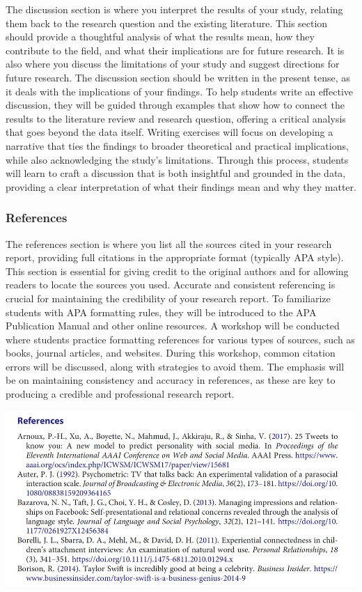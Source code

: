 \documentclass[
]{book}
\begin{document}
The discussion section is where you interpret the results of your study, relating them back to the research question and the existing literature. This section should provide a thoughtful analysis of what the results mean, how they contribute to the field, and what their implications are for future research. It is also where you discuss the limitations of your study and suggest directions for future research. The discussion section should be written in the present tense, as it deals with the implications of your findings. To help students write an effective discussion, they will be guided through examples that show how to connect the results to the literature review and research question, offering a critical analysis that goes beyond the data itself. Writing exercises will focus on developing a narrative that ties the findings to broader theoretical and practical implications, while also acknowledging the study's limitations. Through this process, students will learn to craft a discussion that is both insightful and grounded in the data, providing a clear interpretation of what their findings mean and why they matter.

\subsubsection*{References}\label{references}

The references section is where you list all the sources cited in your research report, providing full citations in the appropriate format (typically APA style). This section is essential for giving credit to the original authors and for allowing readers to locate the sources you used. Accurate and consistent referencing is crucial for maintaining the credibility of your research report. To familiarize students with APA formatting rules, they will be introduced to the APA Publication Manual and other online resources. A workshop will be conducted where students practice formatting references for various types of sources, such as books, journal articles, and websites. During this workshop, common citation errors will be discussed, along with strategies to avoid them. The emphasis will be on maintaining consistency and accuracy in references, as these are key to producing a credible and professional research report.

\includegraphics[width=1\linewidth,height=\textheight,keepaspectratio]{images/fig085.jpg}
\end{document}

